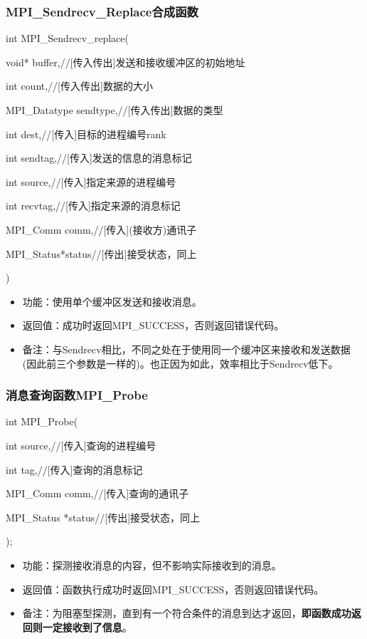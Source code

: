 \documentclass[UTF8]{article}%
\begin{document}
\subsubsection{MPI\_Sendrecv\_Replace合成函数}

int MPI\_Sendrecv\_replace(

    \qquad void* buffer,//[传入传出]发送和接收缓冲区的初始地址

    \qquad int count,//[传入传出]数据的大小

    \qquad MPI\_Datatype sendtype,//[传入传出]数据的类型

    \qquad int dest,//[传入]目标的进程编号rank

    \qquad int sendtag,//[传入]发送的信息的消息标记

    \qquad int source,//[传入]指定来源的进程编号

    \qquad int recvtag,//[传入]指定来源的消息标记

    \qquad MPI\_Comm comm,//[传入](接收方)通讯子

    \qquad MPI\_Status*status//[传出]接受状态，同上

)

\begin{itemize}
    \item 功能：使用单个缓冲区发送和接收消息。
    \item 返回值：成功时返回MPI\_SUCCESS，否则返回错误代码。
    \item 备注：与Sendrecv相比，不同之处在于使用同一个缓冲区来接收和发送数据(因此前三个参数是一样的)。也正因为如此，效率相比于Sendrecv低下。
\end{itemize}

\subsubsection{消息查询函数MPI\_Probe}

int MPI\_Probe(

    \qquad int         source,//[传入]查询的进程编号

    \qquad int         tag,//[传入]查询的消息标记

    \qquad MPI\_Comm   comm,//[传入]查询的通讯子

    \qquad MPI\_Status *status//[传出]接受状态，同上

);

\begin{itemize}
    \item 功能：探测接收消息的内容，但不影响实际接收到的消息。
    \item 返回值：函数执行成功时返回MPI\_SUCCESS，否则返回错误代码。
    \item 备注：为阻塞型探测，直到有一个符合条件的消息到达才返回，\textbf{即函数成功返回则一定接收到了信息}。
\end{itemize}
\end{document}
